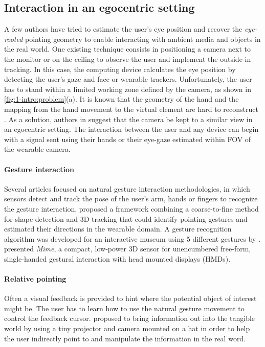 \subsection{Interaction in an egocentric setting}
A few authors have tried to estimate the user's eye position and recover the \textit{eye-rooted} pointing geometry to enable interacting with ambient media and objects in the real world. One existing technique consists in positioning a camera next to the monitor or on the ceiling to observe the user and implement the outside-in tracking. In this case, the computing device calculates the eye position by detecting the user's gaze and face or wearable trackers. Unfortunately, the user has to stand within a limited working zone defined by the camera, as shown in \figurename{ \ref{fig:1-intro:problem}(a)}.
It is known that the geometry of the hand and the mapping from the hand movement to the virtual element are hard to reconstruct \cite{Raheja2011}. As a solution, authors in  \cite{Mistry2009,Harrison2011} suggest that the camera be kept to a similar view in an egocentric setting.
The interaction between the user and any device can begin with a signal sent using their hands or their eye-gaze estimated within FOV of the wearable camera.

\paragraph{Gesture interaction} Several articles focused on natural gesture interaction methodologies, in which sensors detect and track the pose of the user's arm, hands or fingers to recognize the gesture interaction.
\citet{DeCampos2006} proposed a framework combining a coarse-to-fine method for shape detection and 3D tracking that could identify pointing gestures and estimated their directions in the wearable domain. A gesture recognition algorithm was developed for an interactive museum using 5 different gestures by  \citet{Garcia-Rodriguez2011}. 
\citet{Colaco2013a} presented \textit{Mime}, a compact, low-power 3D sensor for unencumbered free-form, single-handed gestural interaction with head mounted displays (HMDs).

\paragraph{Relative pointing} Often a visual feedback is provided to hint where the potential object of interest might be. The user has to learn how to use the natural gesture movement to control the feedback cursor.
\citet{Mistry2009} proposed to bring information out into the tangible world by using a tiny projector and camera mounted on a hat in order to help the user indirectly point to and manipulate the information in the real word.

